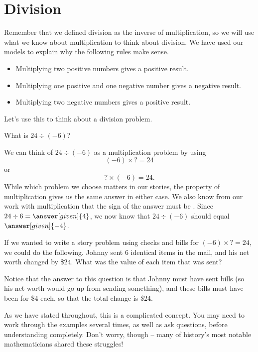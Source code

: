 \documentclass{ximera}
\begin{document}
\section{Division}

Remember that we defined division as the inverse of multiplication, so we will use what we know about multiplication to think about division. We have used our models to explain why the following rules make sense.
\begin{itemize}
	\item Multiplying two positive numbers gives a positive result.
	\item Multiplying one positive and one negative number gives a negative result.
	\item Multiplying two negative numbers gives a positive result.
\end{itemize}  
Let's use this to think about a division problem.

\begin{example}
What is $24 \div (-6)$?

We can think of $24 \div (-6)$ as a multiplication problem by using
\[
(-6) \times ? = 24
\]
or
\[
? \times (-6) = 24.
\]
While which problem we choose matters in our stories, the  property of multiplication gives us the same answer in either case.  We also know from our work with multiplication that the sign of the answer must be .  Since $24 \div 6 = \answer[given]{4}$, we now know that $24 \div (-6)$ should equal $\answer[given]{-4}$.

If we wanted to write a story problem using checks and bills for $(-6) \times ? = 24$, we could do the following. Johnny sent $6$ identical items in the mail, and his net worth changed by \$$24$. What was the value of each item that was sent?

Notice that the answer to this question is that Johnny must have sent bills (so his net worth would go up from sending something), and these bills must have been for \$$4$ each, so that the total change is \$$24$.



\end{example}



As we have stated throughout, this is a complicated concept.  You may need to work through the examples several times, as well as ask questions, before understanding completely.  Don't worry, though -- many of history's most notable mathematicians shared these struggles!
\end{document}
